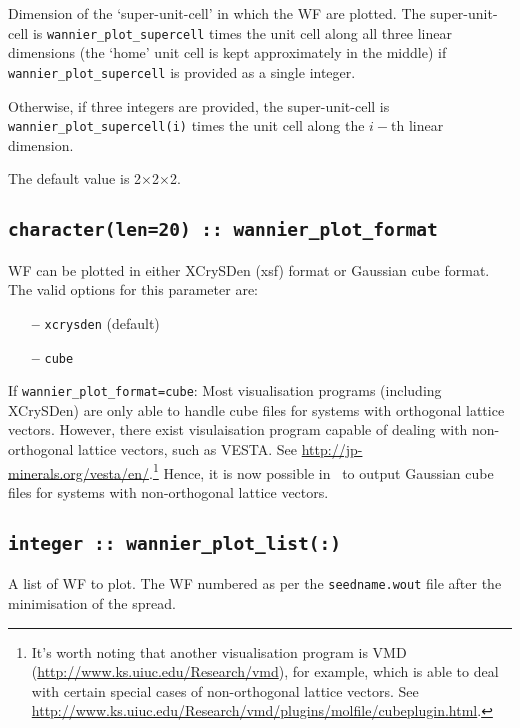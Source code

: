 Dimension of the `super-unit-cell' in which the WF are
plotted. The super-unit-cell is \verb#wannier_plot_supercell# times
the unit cell along all three linear dimensions (the `home' unit cell
is kept approximately in the middle) if \verb#wannier_plot_supercell#
is provided as a single integer.

Otherwise, if three integers are
provided, the super-unit-cell is \verb#wannier_plot_supercell(i)#
times the unit cell along the $i-$th linear dimension.

The default value is 2$\times$2$\times$2.

\subsection[wannier\_plot\_format]{\tt character(len=20) :: wannier\_plot\_format}

WF can be plotted in either XCrySDen (xsf) format or Gaussian cube
format. The valid options for this parameter are:
\begin{itemize}
\item[{\bf --}] \verb#xcrysden# (default)
\item[{\bf --}] \verb#cube#
\end{itemize}

If {\tt wannier\_plot\_format=cube}: Most visualisation programs
(including XCrySDen) are only able to handle cube files for systems
with orthogonal lattice vectors. However, there exist visulaisation program capable of dealing with non-orthogonal lattice vectors, such as VESTA. 
  See \url{http://jp-minerals.org/vesta/en/}.\footnote{It's worth noting that another 
  visualisation program is VMD (\url{http://www.ks.uiuc.edu/Research/vmd}), for example, which is able to
  deal with certain special cases of non-orthogonal lattice
  vectors. See \url{http://www.ks.uiuc.edu/Research/vmd/plugins/molfile/cubeplugin.html}.}
  Hence, it is now possible in \wannier\ to output Gaussian cube files for systems with non-orthogonal lattice vectors.

\subsection[wannier\_plot\_list]{\tt integer :: wannier\_plot\_list(:)}

 A list of WF to plot. The WF numbered
 as per the {\tt seedname.wout} file after the minimisation of the
 spread. 

